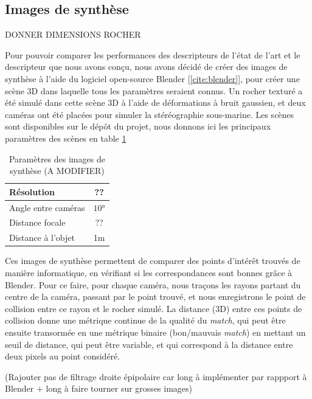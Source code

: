 \documentclass[
	a4paper, %
	10pt, %
	unnumberedsections, %
	twoside, %
]{LTJournalArticle}
\begin{document}
\subsection{Images de synthèse}

DONNER DIMENSIONS ROCHER

Pour pouvoir comparer les performances des descripteurs de l'état de l'art et le descripteur que nous avons conçu, nous avons décidé de créer des images de synthèse à l'aide du logiciel open-source Blender [\ref{cite:blender}], pour créer une scène 3D dans laquelle tous les paramètres seraient connus.
Un rocher texturé a été simulé dans cette scène 3D à l'aide de déformations à bruit gaussien, et deux caméras ont été placées pour simuler la stéréographie sous-marine.
Les scènes sont disponibles sur le dépôt du projet, nous donnons ici les principaux paramètres des scènes en table \ref{table:params_syn_imgs}

\begin{table}[t]
	\begin{adjustbox}{width=\columnwidth, left}
		\begin{tabular}{l c}
			\hline
			Résolution          & ??    \\
			\hline
			Angle entre caméras & $10$° \\
			Distance focale     & ??    \\
			Distance à l'objet  & 1m    \\
			\hline
		\end{tabular}
	\end{adjustbox}
	\label{table:params_syn_imgs}
	\caption{Paramètres des images de synthèse (A MODIFIER)}
\end{table}

Ces images de synthèse permettent de comparer des points d'intérêt trouvés de manière informatique, en vérifiant si les correspondances sont bonnes grâce à Blender.
Pour ce faire, pour chaque caméra, nous traçons les rayons partant du centre de la caméra, passant par le point trouvé, et nous enregistrons le point de collision entre ce rayon et le rocher simulé.
La distance (3D) entre ces points de collision donne une métrique continue de la qualité du \textit{match}, qui peut être ensuite transormée en une métrique binaire (bon/mauvais \textit{match}) en mettant un seuil de distance, qui peut être variable, et qui correspond à la distance entre deux pixels au point considéré.


(Rajouter pas de filtrage droite épipolaire car long à implémenter par rappport à Blender + long à faire tourner sur grosses images)
\end{document}

